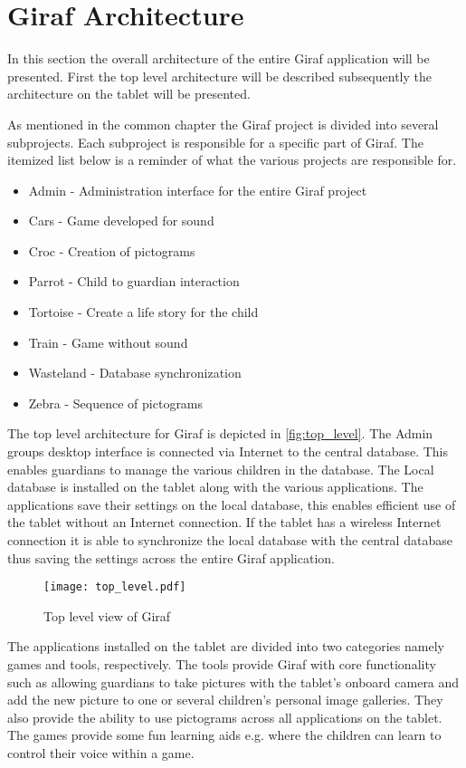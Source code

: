

\section{Giraf Architecture}
In this section the overall architecture of the entire Giraf application will be presented. First the top level architecture will be described subsequently the architecture on the tablet will be presented.

As mentioned in the common chapter  the Giraf project is divided into several subprojects. Each subproject is responsible for a specific part of Giraf. The itemized list below is a reminder of what the various projects are responsible for.

\begin{itemize}
	\item Admin - Administration interface for the entire Giraf project
	\item Cars - Game developed for sound
	\item Croc - Creation of pictograms
	\item Parrot - Child to guardian interaction
	\item Tortoise - Create a life story for the child
	\item Train - Game without sound
	\item Wasteland - Database synchronization
	\item Zebra - Sequence of pictograms
\end{itemize}

The top level architecture for Giraf is depicted in \autoref{fig:top_level}. The Admin groups desktop interface is connected via Internet to the central database. This enables guardians to manage the various children in the database. The Local database is installed on the tablet along with the various applications. The applications save their settings on the local database, this enables efficient use of the tablet without an Internet connection. If the tablet has a wireless Internet connection it is able to synchronize the local database with the central database thus saving the settings across the entire Giraf application. 

\begin{figure}[htpb]
\texttt{[image: top\_level.pdf]}
\label{fig:top_level}
\caption{Top level view of Giraf}
\end{figure}

The applications installed on the tablet are divided into two categories namely games and tools, respectively. The tools provide Giraf with core functionality such as allowing guardians to take pictures with the tablet's onboard camera and add the new picture to one or several children's personal image galleries. They also provide the ability to use pictograms across all applications on the tablet. The games provide some fun learning aids e.g. where the children can learn to control their voice within a game. 

